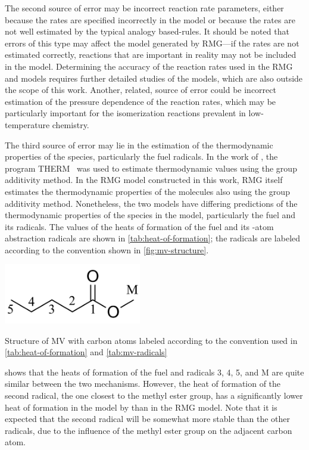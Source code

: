 \documentclass[letterpaper, review, sort&compress]{elsarticle}
\begin{document}
The second source of error may be incorrect reaction rate parameters, either because the rates are
specified incorrectly in the model or because the rates are not well estimated by the
typical analogy based-rules. It should be noted that errors of this type may affect the model
generated by RMG---if the rates are not estimated correctly, reactions that are important in reality
may not be included in the model. Determining the accuracy of the reaction rates used in the RMG and
\citet{Dievart2013} models requires further detailed studies of the models, which are also outside
the scope of this work. Another, related, source of error could be incorrect estimation of the
pressure dependence of the reaction rates, which may be particularly important for the isomerization
reactions prevalent in low-temperature chemistry.

The third source of error may lie in the estimation of the thermodynamic properties of the species,
particularly the fuel radicals. In the work of \citet{Dievart2013}, the program
THERM~\cite{Ritter1991} was used to estimate thermodynamic values using the group additivity method.
In the RMG model constructed in this work, RMG itself estimates the thermodynamic properties of the
molecules also using the group additivity method. Nonetheless, the two models have differing
predictions of the thermodynamic properties of the species in the model, particularly the fuel and
its radicals. The values of the heats of formation of the fuel and its -atom abstraction
radicals are shown in \cref{tab:heat-of-formation}; the radicals are labeled according to the
convention shown in \cref{fig:mv-structure}.

\begin{center}
    \captionsetup{type=figure}
    \includegraphics[width=60mm]{figures/Methyl_pentanoate.png}
    \caption{Structure of MV with carbon atoms labeled according to the convention used in
    \cref{tab:heat-of-formation} and \cref{tab:mv-radicals}}
    \label{fig:mv-structure}
\end{center}

 shows that the heats of formation of the fuel and radicals 3, 4, 5, and
M are quite similar between the two mechanisms. However, the heat of formation of the second
radical, the one closest to the methyl ester group, has a significantly lower heat of formation in
the model by \citet{Dievart2013} than in the RMG model. Note that it is expected that the second
radical will be somewhat more stable than the other radicals, due to the influence of the methyl
ester group on the adjacent carbon atom.
\end{document}
